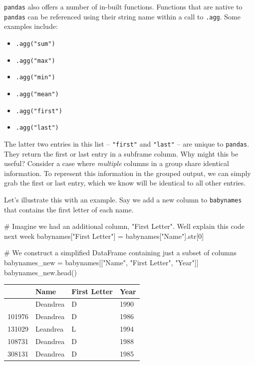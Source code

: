 \documentclass[
  letterpaper,
  DIV=11,
  numbers=noendperiod]{scrreprt}
\newenvironment{Shaded}{\begin{snugshade}}{\end{snugshade}}
\newcommand{\BuiltInTok}[1]{\textcolor[rgb]{0.00,0.23,0.31}{#1}}
\newcommand{\CommentTok}[1]{\textcolor[rgb]{0.37,0.37,0.37}{#1}}
\newcommand{\DecValTok}[1]{\textcolor[rgb]{0.68,0.00,0.00}{#1}}
\newcommand{\NormalTok}[1]{\textcolor[rgb]{0.00,0.23,0.31}{#1}}
\newcommand{\OperatorTok}[1]{\textcolor[rgb]{0.37,0.37,0.37}{#1}}
\newcommand{\StringTok}[1]{\textcolor[rgb]{0.13,0.47,0.30}{#1}}
\providecommand{\tightlist}{%
  \setlength{\itemsep}{0pt}\setlength{\parskip}{0pt}}\usepackage{longtable,booktabs,array}
\begin{document}
\texttt{pandas} also offers a number of in-built functions. Functions
that are native to \texttt{pandas} can be referenced using their string
name within a call to \texttt{.agg}. Some examples include:

\begin{itemize}
\tightlist
\item
  \texttt{.agg("sum")}
\item
  \texttt{.agg("max")}
\item
  \texttt{.agg("min")}
\item
  \texttt{.agg("mean")}
\item
  \texttt{.agg("first")}
\item
  \texttt{.agg("last")}
\end{itemize}

The latter two entries in this list -- \texttt{"first"} and
\texttt{"last"} -- are unique to \texttt{pandas}. They return the first
or last entry in a subframe column. Why might this be useful? Consider a
case where \emph{multiple} columns in a group share identical
information. To represent this information in the grouped output, we can
simply grab the first or last entry, which we know will be identical to
all other entries.

Let's illustrate this with an example. Say we add a new column to
\texttt{babynames} that contains the first letter of each name.

\begin{Shaded}
\begin{Highlighting}[]
\CommentTok{\# Imagine we had an additional column, "First Letter". We\textquotesingle{}ll explain this code next week}
\NormalTok{babynames[}\StringTok{"First Letter"}\NormalTok{] }\OperatorTok{=}\NormalTok{ babynames[}\StringTok{"Name"}\NormalTok{].}\BuiltInTok{str}\NormalTok{[}\DecValTok{0}\NormalTok{]}

\CommentTok{\# We construct a simplified DataFrame containing just a subset of columns}
\NormalTok{babynames\_new }\OperatorTok{=}\NormalTok{ babynames[[}\StringTok{"Name"}\NormalTok{, }\StringTok{"First Letter"}\NormalTok{, }\StringTok{"Year"}\NormalTok{]]}
\NormalTok{babynames\_new.head()}
\end{Highlighting}
\end{Shaded}

\begin{longtable}[]{@{}llll@{}}
\toprule\noalign{}
& Name & First Letter & Year \\
\midrule\noalign{}
\endhead
\bottomrule\noalign{}
\endlastfoot
115957 & Deandrea & D & 1990 \\
101976 & Deandrea & D & 1986 \\
131029 & Leandrea & L & 1994 \\
108731 & Deandrea & D & 1988 \\
308131 & Deandrea & D & 1985 \\
\end{longtable}
\end{document}
